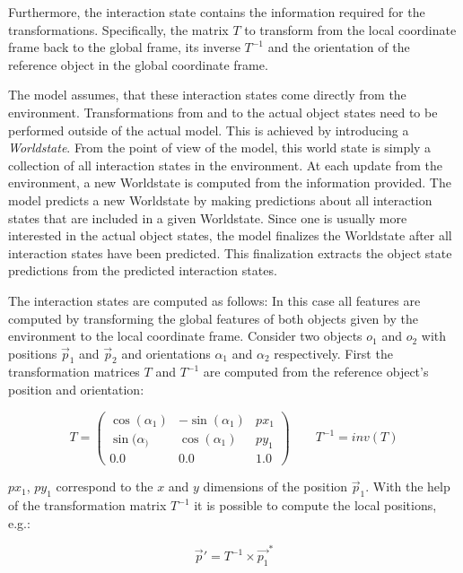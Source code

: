 Furthermore, the interaction state contains the information required for the transformations. Specifically, the matrix $T$ to transform from the local coordinate frame back to the global 
frame, its inverse $T^{-1}$ and the orientation of the reference object in the global coordinate frame.

The model assumes, that these interaction states come directly from the environment. Transformations from and to the actual object states need to be performed outside of the actual model. This is achieved by introducing a \textit{Worldstate}. From the point of view of the model, this world state is simply a collection of all interaction states in the environment. At each update from the environment, a new Worldstate is computed from the information provided. The model predicts a new Worldstate by making predictions about all interaction states that are included in a given Worldstate. Since one is usually more interested in the actual object states, the model finalizes the Worldstate after all interaction states have been predicted. This finalization extracts the object state predictions from the predicted interaction states. 

The interaction states are computed as follows:
In this case all features are computed by transforming the global features of both objects given by the environment to the local coordinate frame. Consider two objects $o_1$ and $o_2$ with positions $\vec{p}_1$ and $\vec{p}_2$ and orientations $\alpha_1$ and $\alpha_2$ respectively. First the transformation matrices $T$ and $T^{-1}$ are computed from the reference object's position and orientation:

\begin{equation}
T = \begin{pmatrix}
\cos(\alpha_1) & -\sin(\alpha_1) & px_1 \\
\sin(\alpha_) & \cos(\alpha_1) & py_1 \\
0.0 & 0.0 & 1.0
\end{pmatrix}
\qquad
T^{-1} = inv(T)
\label{eq:transMatrix}
\end{equation}

$px_1$, $py_1$ correspond to the $x$ and $y$ dimensions of the position $\vec{p}_1$. With the help of the transformation matrix $T^{-1}$ it is possible to compute the local positions, e.g.:

\begin{equation}
\vec{p}' = T^{-1} \times \vec{p_1}^*
\end{equation}

